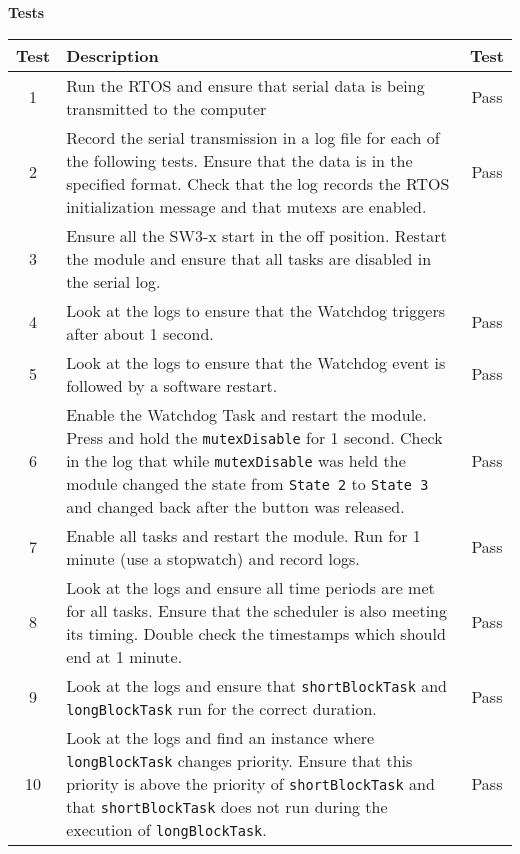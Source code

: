 \documentclass{article}
\begin{document}
\begin{center}
    \textbf{Tests} \\
    \vspace{0.5em}
    \begin{tabular}{| c | p{35em} | c | }
    \hline
    \textbf{Test} & \textbf{Description} & \textbf{Test} \\ \hline
    1 & Run the RTOS and ensure that serial data is being transmitted to the computer & Pass \\ \hline
    2 & Record the serial transmission in a log file for each of the following tests. Ensure that the data is in the specified format. Check that the log records the RTOS initialization message and that mutexs are enabled. & Pass \\ \hline
    3 & Ensure all the SW3-x start in the off position. Restart the module and ensure that all tasks are disabled in the serial log. \\ \hline
    4 & Look at the logs to ensure that the Watchdog triggers after about 1 second. & Pass \\ \hline
    5 & Look at the logs to ensure that the Watchdog event is followed by a software restart. & Pass \\ \hline
    6 & Enable the Watchdog Task and restart the module. Press and hold the \texttt{mutexDisable} for 1 second. Check in the log that while \texttt{mutexDisable} was held the module changed the state from \texttt{State 2} to \texttt{State 3} and changed back after the button was released. & Pass \\ \hline
    7 & Enable all tasks and restart the module. Run for 1 minute (use a stopwatch) and record logs. & Pass \\ \hline
    8 & Look at the logs and ensure all time periods are met for all tasks. Ensure that the scheduler is also meeting its timing. Double check the timestamps which should end at 1 minute. & Pass \\ \hline
    9 & Look at the logs and ensure that \texttt{shortBlockTask} and \texttt{longBlockTask} run for the correct duration. & Pass \\ \hline
    10 & Look at the logs and find an instance where \texttt{longBlockTask} changes priority. Ensure that this priority is above the priority of \texttt{shortBlockTask} and that \texttt{shortBlockTask} does not run during the execution of \texttt{longBlockTask}. & Pass \\ \hline
    \end{tabular}
\end{center}
\end{document}
